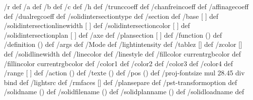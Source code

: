 /r \pst@solides@r\space def %
/a \pst@solides@a\space def %
/b \pst@solides@b\space def %
/c \pst@solides@c\space def %
/h \pst@solides@h\space def %
/trunccoeff \pst@solides@trunccoeff\space def %
/chanfreincoeff \pst@solides@chanfreincoeff\space def %
/affinagecoeff \pst@solides@affinagecoeff\space def %
/dualregcoeff \pst@solides@dualregcoeff\space def %
/solidintersectiontype \pst@solides@intersectiontype\space def %
/section {\pst@solides@section} def %
/base [ \pst@solides@base ] def
/solidintersectionlinewidth [ \pst@solides@intersectionlinewidth ] def
/solidintersectioncolor [ \pst@solides@intersectioncolor ] def
/solidintersectionplan [ \pst@solides@intersectionplan ] def
/axe  { \pst@solides@axe } def
/plansection  [ \pst@solides@plansection ] def
\ifx\pst@solides@function\@empty\else /function (\pst@solides@function) def \fi
%
/definition  (\pst@solides@definition) def
/args  { \pst@solides@args} def
/Mode \pst@solides@mode\space def %
/lightintensity \pst@solides@lightintensity\space def %
/tablez  [\pst@solides@tablez] def
/zcolor  [\pst@solides@zcolor] def
%
/solidlinewidth {\pst@number\pslinewidth} def
/linecolor  {\pst@usecolor\pslinecolor} def
/linestyle  {\pslinestyle} def
/fillcolor  {\pst@usecolor\psfillcolor currentrgbcolor} def
/fillincolor  {\pst@usecolor\psincolor currentrgbcolor} def
%
/color1 {\pst@usecolor\pscolora } def
/color2 {\pst@usecolor\pscolorb } def
/color3 {\pst@usecolor\pscolorc } def
/color4 {\pst@usecolor\pscolord } def
%
/range [ \pst@solides@range ] def
/action (\pst@solides@action) def
/texte (\pst@solides@text) def
/pos (\pst@solides@pos) def
/proj-fontsize {\pst@solides@fontsize\space \pst@number\psunit mul 28.45 div } bind def
%
\ifx\pst@solides@CoordinatesLight\@empty\else /lightsrc {\pst@solides@CoordinatesLight} def \fi
%
/rmfaces [\pst@solides@CoordinatesRm] def
\ifx\pst@solides@plansepare\@empty\else/plansepare {\pst@solides@plansepare} def\fi
\ifx\pst@solides@transform\@empty \else/pst-transformoption { \pst@solides@transform} def\fi
\ifx\pst@solides@name\@empty      \else/solidname (\pst@solides@name) def\fi
\ifx\pst@solides@file\@empty      \else/solidfilename (\pst@solides@file) def\fi
\ifx\pst@solides@planname\@empty  \else/solidplanname (\pst@solides@planname) def\fi
\ifx\pst@solides@load\@empty      \else/solidloadname {\pst@solides@load} def\fi
